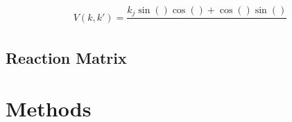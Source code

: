 \documentclass[10pt,showpacs,preprintnumbers,footinbib,amsmath,amssymb,aps,prl,twocolumn,groupedaddress,superscriptaddress,showkeys]{revtex4-1}
\begin{document}
\begin{equation}
	V(k,k') = \frac{k_j \sin()\cos() + \cos()\sin()}{}
\end{equation}


\subsection{Reaction Matrix}




\section{Methods}
\end{document}
